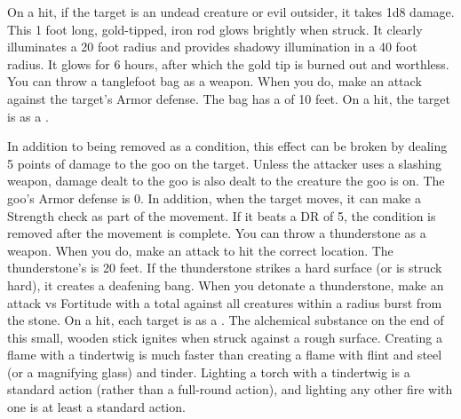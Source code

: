        On a hit, if the target is an undead creature or evil outsider, it takes 1d8 damage.
         This 1 foot long, gold-tipped, iron rod glows brightly when struck. It clearly illuminates a 20 foot radius and provides shadowy illumination in a 40 foot radius. It glows for 6 hours, after which the gold tip is burned out and worthless.
         You can throw a tanglefoot bag as a weapon.
        When you do, make an attack against the target's Armor defense.
        The bag has a  of 10 feet.
        On a hit, the target is \slowed as a .
        \par In addition to being removed as a condition, this effect can be broken by dealing 5 points of damage to the goo on the target.
        Unless the attacker uses a slashing weapon, damage dealt to the goo is also dealt to the creature the goo is on.
        The goo's Armor defense is 0. %
        In addition, when the target moves, it can make a Strength check as part of the movement.
        If it beats a DR of 5, the condition is removed after the movement is complete.
         You can throw a thunderstone as a weapon.
        When you do, make an attack to hit the correct location.
        The thunderstone's  is 20 feet.
        If the thunderstone strikes a hard surface (or is struck hard), it creates a deafening bang.
        When you detonate a thunderstone, make an attack vs Fortitude with a  total  against all creatures within a \areasmall radius burst from the stone.
        On a hit, each target is  as a .
         The alchemical substance on the end of this small, wooden stick ignites when struck against a rough surface. Creating a flame with a tindertwig is much faster than creating a flame with flint and steel (or a magnifying glass) and tinder. Lighting a torch with a tindertwig is a standard action (rather than a full-round action), and lighting any other fire with one is at least a standard action.

